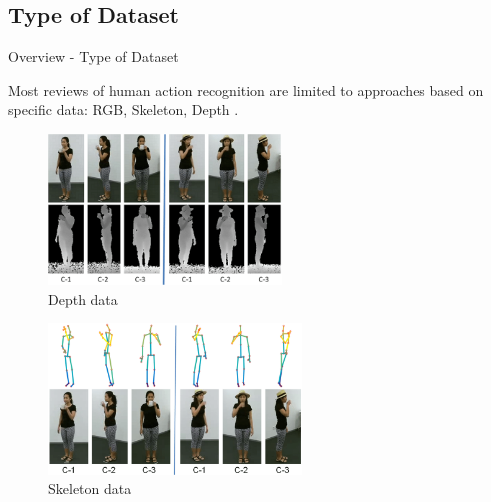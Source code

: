 \subsection{Type of Dataset}
\begin{frame}{Overview - Type of Dataset}

    Most reviews of human action recognition are limited to approaches based on specific data: RGB, Skeleton, Depth \cite{shahroudy2016ntu}.

    \begin{multicols}{2}
        \begin{figure}[htp]
            \centering
            \includegraphics[height=4cm]{topics/201010-zhang2019comprehensive/assets/img/depth_data_ex.png}
            \caption{Depth data}
            \label{fig:depth_data_ex}
        \end{figure}
        \begin{figure}[htp]
            \centering
            \includegraphics[height=4cm]{topics/201010-zhang2019comprehensive/assets/img/skeleton_data_ex.png}
            \caption{Skeleton data}
            \label{fig:skeleton_data_ex}
        \end{figure}
    \end{multicols}
\end{frame}